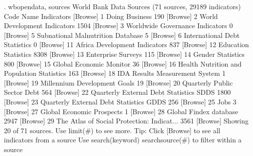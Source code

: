 . wbopendata, sources
{\smallskip}
World Bank Data Sources (71 sources, 29189 indicators)
  Code  Name                                         Indicators  [Browse]
     1  Doing Business                                      190  [Browse]
     2  World Development Indicators                       1504  [Browse]
     3  Worldwide Governance Indicators                       0  [Browse]
     5  Subnational Malnutrition Database                     5  [Browse]
     6  International Debt Statistics                         0  [Browse]
    11  Africa Development Indicators                       837  [Browse]
    12  Education Statistics                               8308  [Browse]
    13  Enterprise Surveys                                  115  [Browse]
    14  Gender Statistics                                   800  [Browse]
    15  Global Economic Monitor                              36  [Browse]
    16  Health Nutrition and Population Statistics          163  [Browse]
    18  IDA Results Measurement System                        1  [Browse]
    19  Millennium Development Goals                         19  [Browse]
    20  Quarterly Public Sector Debt                        564  [Browse]
    22  Quarterly External Debt Statistics SDDS            1800  [Browse]
    23  Quarterly External Debt Statistics GDDS             256  [Browse]
    25  Jobs                                                  3  [Browse]
    27  Global Economic Prospects                             1  [Browse]
    28  Global Findex database                             2947  [Browse]
    29  The Atlas of Social Protection: Indicat...         3561  [Browse]
Showing 20 of 71 sources. Use limit(\#) to see more.
{\smallskip}
Tip: Click [Browse] to see all indicators from a source
     Use search(keyword) searchsource(\#) to filter within a source
